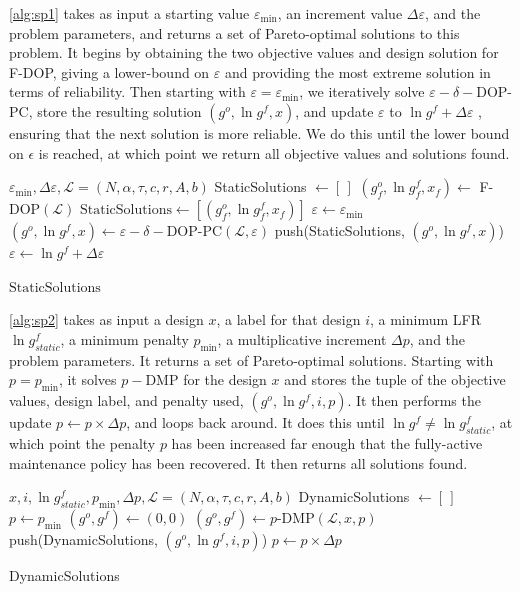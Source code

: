 \documentclass[11pt,authoryear,a4paper]{article}
\theoremstyle{definition}
\begin{document}
\autoref{alg:sp1} takes as input a starting value $\varepsilon_{\min}$, an increment value $\Delta\varepsilon$, and the problem parameters, and returns a set of Pareto-optimal solutions to this problem. It begins by obtaining the two objective values and design solution for F-DOP, giving a lower-bound on $\varepsilon$ and providing the most extreme solution in terms of reliability. Then starting with $\varepsilon = \varepsilon_{\min}$, we iteratively solve $\varepsilon-\delta-$DOP-PC, store the resulting solution $(g^o, \ln g^f, x)$, and update $\varepsilon$ to $\ln g^f + \Delta\varepsilon$ , ensuring that the next solution is more reliable. We do this until the lower bound on $\epsilon$ is reached, at which point we return all objective values and solutions found.

\begin{algorithm}[h]
\caption{SP1} \label{alg:sp1}
\begin{algorithmic}
\Require $\varepsilon_{\min}, \Delta\varepsilon,\mathcal{L} =  (N, \alpha, \tau, c, r, A, b)$
\State StaticSolutions $\gets [\,]$
\State $(g^o_f, \ln g^f_f, x_f) \gets$ F-DOP$(\mathcal{L})$
\State $\text{StaticSolutions}\gets [(g^o_f, \ln g^f_f, x_f)]$
\State $\varepsilon \gets \varepsilon_{\min}$
    \State $(g^o, \ln g^f, x) \gets \varepsilon-\delta-\text{DOP-PC}(\mathcal{L}, \varepsilon)$
    \State push(StaticSolutions, $(g^o, \ln g^f, x)$)
    \State $\varepsilon \gets \ln g^f + \Delta\varepsilon$
\EndWhile

\Return $\text{StaticSolutions}$
\end{algorithmic}
\end{algorithm}

\autoref{alg:sp2} takes as input a design $x$, a label for that design $i$, a minimum LFR $\ln g^f_{static}$, a minimum penalty $p_{\min}$, a multiplicative increment $\Delta p$, and the problem parameters. It returns a set of Pareto-optimal solutions. Starting with $p = p_{\min}$, it solves $p-$DMP for the design $x$ and stores the tuple of the objective values, design label, and penalty used, $(g^o, \ln g^f, i, p)$. It then performs the update $p\gets p\times\Delta p$, and loops back around. It does this until $\ln g^f \neq \ln g^f_{static}$, at which point the penalty $p$ has been increased far enough that the fully-active maintenance policy has been recovered. It then returns all solutions found.

\begin{algorithm}[h]
\caption{SP2} \label{alg:sp2}
\begin{algorithmic}
\Require $x, i, \ln g^f_{static}, p_{\min}, \Delta p, \mathcal{L} =  (N, \alpha, \tau, c, r, A, b)$
\State DynamicSolutions $\gets [\,]$
\State $p\gets p_{\min}$
\State $(g^o, g^f) \gets (0,0)$
    \State $(g^o, g^f) \gets p$-DMP$(\mathcal{L}, x, p)$
    \State push(DynamicSolutions, $(g^o, \ln g^f, i, p)$)
    \State $p \gets p\times\Delta p$
\EndWhile

\Return DynamicSolutions
\end{algorithmic}
\end{algorithm}
\end{document}

